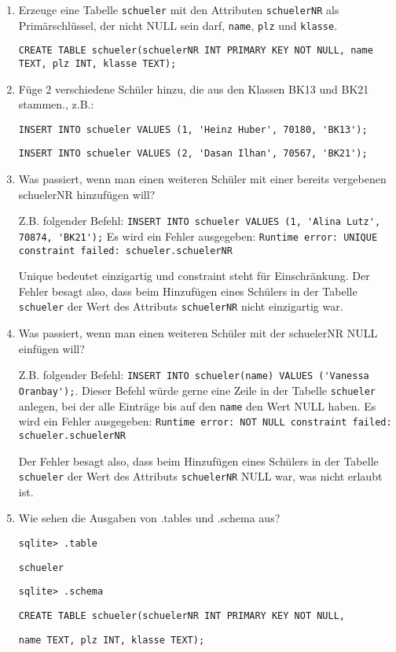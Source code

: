 \begin{Answer}[ref=Befuellen]
	\begin{enumerate}
		\item Erzeuge eine Tabelle \lstinline!schueler! mit den Attributen \lstinline!schuelerNR! als Primärschlüssel, der nicht NULL sein darf, \lstinline!name!, \lstinline!plz! und \lstinline!klasse!.

		\lstinline[breaklines=true]!CREATE TABLE schueler(schuelerNR INT PRIMARY KEY NOT NULL, name TEXT, plz INT, klasse TEXT);!
		\item Füge 2 verschiedene Schüler hinzu, die aus den Klassen BK13 und BK21 stammen., z.B.:

		\lstinline!INSERT INTO schueler VALUES (1, 'Heinz Huber', 70180, 'BK13');!

		\lstinline!INSERT INTO schueler VALUES (2, 'Dasan Ilhan', 70567, 'BK21');!

		\item Was passiert, wenn man einen weiteren Schüler mit einer bereits vergebenen schuelerNR hinzufügen will?

		Z.B. folgender Befehl: \lstinline!INSERT INTO schueler VALUES (1, 'Alina Lutz', 70874, 'BK21');!
		Es wird ein Fehler ausgegeben: \lstinline!Runtime error: UNIQUE constraint failed: schueler.schuelerNR!

		Unique bedeutet einzigartig und constraint steht für Einschränkung. Der Fehler besagt also, dass beim Hinzufügen eines Schülers in der Tabelle \lstinline!schueler! der Wert des Attributs \lstinline!schuelerNR! nicht einzigartig war.
		\item Was passiert, wenn man einen weiteren Schüler mit der schuelerNR NULL einfügen will?

		Z.B. folgender Befehl: \lstinline!INSERT INTO schueler(name) VALUES ('Vanessa Oranbay');!. Dieser Befehl würde gerne eine Zeile in der Tabelle \lstinline!schueler! anlegen, bei der alle Einträge bis auf den \lstinline!name! den Wert NULL haben.
		Es wird ein Fehler ausgegeben: \lstinline!Runtime error: NOT NULL constraint failed: schueler.schuelerNR!

		Der Fehler besagt also, dass beim Hinzufügen eines Schülers in der Tabelle \lstinline!schueler! der Wert des Attributs \lstinline!schuelerNR! NULL war, was nicht erlaubt ist.
		\item Wie sehen die Ausgaben von .tables und .schema aus?

		\lstinline!sqlite> .table!

		\lstinline!schueler!

		\lstinline!sqlite> .schema!

		\lstinline!CREATE TABLE schueler(schuelerNR INT PRIMARY KEY NOT NULL,!

		\lstinline!name TEXT, plz INT, klasse TEXT);!
	\end{enumerate}
\end{Answer}